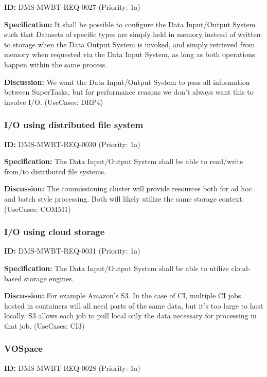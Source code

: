 \documentclass[SE,toc,lsstdraft]{lsstdoc}
\begin{document}
\label{DMS-MWBT-REQ-0027}
\textbf{ID:} DMS-MWBT-REQ-0027 (Priority: 1a)

\textbf{Specification:}
It shall be possible to configure the Data Input/Output System such that Datasets of specific types are simply held in memory instead of written to storage when the Data Output System is invoked, and simply retrieved from memory when requested via the Data Input System, as long as both operations happen within the same process.

\textbf{Discussion:}
We want the Data Input/Output System to pass all information between SuperTasks, but for performance reasons we don't always want this to involve I/O. (UseCases: DRP4)

\subsubsection{I/O using distributed file system}

\label{DMS-MWBT-REQ-0030}
\textbf{ID:} DMS-MWBT-REQ-0030 (Priority: 1a)

\textbf{Specification:}
The Data Input/Output System shall be able to read/write from/to distributed file systems.

\textbf{Discussion:}
The commissioning cluster will provide resources both for ad hoc and batch style processing. Both will likely utilize the same storage context. (UseCases: COMM1)

\subsubsection{I/O using cloud storage}

\label{DMS-MWBT-REQ-0031}
\textbf{ID:} DMS-MWBT-REQ-0031 (Priority: 1a)

\textbf{Specification:}
The Data Input/Output System shall be able to utilize cloud-based storage engines.

\textbf{Discussion:}
For example Amazon's S3. In the case of CI, multiple CI jobs hosted in containers will all need parts of the same data, but it's too large to host locally. S3 allows each job to pull local only the data necessary for processing in that job. (UseCases: CI3)

\subsubsection{VOSpace}

\label{DMS-MWBT-REQ-0028}
\textbf{ID:} DMS-MWBT-REQ-0028 (Priority: 1a)
\end{document}
